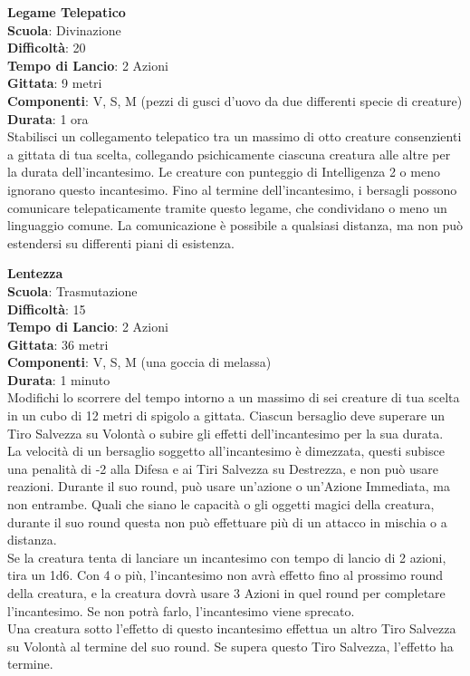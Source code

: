 \begin{multicols}{2}
\medskip\textbf{Legame Telepatico}\\
\textbf{Scuola}: Divinazione\\
\textbf{Difficoltà}:  20\\
\textbf{Tempo di Lancio}: 2 Azioni\\
\textbf{Gittata}: 9 metri\\
\textbf{Componenti}: V, S, M (pezzi di gusci d’uovo da due differenti specie di creature)\\
\textbf{Durata}: 1 ora\\
Stabilisci un collegamento telepatico tra un massimo di otto creature consenzienti a gittata di tua scelta, collegando psichicamente ciascuna creatura alle altre per la durata dell'incantesimo. Le creature con punteggio di Intelligenza 2 o meno ignorano questo incantesimo. Fino al termine dell'incantesimo, i bersagli possono comunicare telepaticamente tramite questo legame, che condividano o meno un linguaggio comune. La comunicazione è possibile a qualsiasi distanza, ma non può estendersi su differenti piani di esistenza.

\medskip\textbf{Lentezza}\\
\textbf{Scuola}: Trasmutazione\\
\textbf{Difficoltà}:  15\\
\textbf{Tempo di Lancio}: 2 Azioni\\
\textbf{Gittata}: 36 metri\\
\textbf{Componenti}: V, S, M (una goccia di melassa) \\
\textbf{Durata}: 1 minuto\\
Modifichi lo scorrere del tempo intorno a un massimo di sei creature di tua scelta in un cubo di 12 metri di spigolo a gittata. Ciascun bersaglio deve superare un Tiro Salvezza su Volontà o subire gli effetti dell'incantesimo per la sua durata.\\
La velocità di un bersaglio soggetto all'incantesimo è dimezzata, questi subisce una penalità di -2 alla Difesa e ai Tiri Salvezza su Destrezza, e non può usare reazioni. Durante il suo round, può usare un'azione o un'Azione Immediata, ma non entrambe. Quali che siano le capacità o gli oggetti magici della creatura, durante il suo round questa non può effettuare più di un attacco in mischia o a distanza.\\
Se la creatura tenta di lanciare un incantesimo con tempo di lancio di 2 azioni, tira un 1d6. Con 4 o più, l'incantesimo non avrà effetto fino al prossimo round della creatura, e la creatura dovrà usare 3 Azioni in quel round per completare l'incantesimo. Se non potrà farlo, l'incantesimo viene sprecato.\\
Una creatura sotto l’effetto di questo incantesimo effettua un altro Tiro Salvezza su Volontà al termine del suo round. Se supera questo Tiro Salvezza, l’effetto ha termine.\\


\end{multicols}

